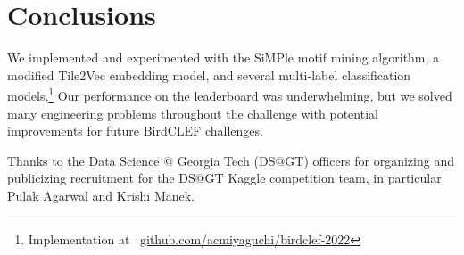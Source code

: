 \documentclass[
]{ceurart}
\begin{document}
\section{Conclusions}

We implemented and experimented with the SiMPle motif mining algorithm, a modified Tile2Vec embedding model, and several multi-label classification models.\footnote{Implementation at \
\href{https://github.com/acmiyaguchi/birdclef-2022}{github.com/acmiyaguchi/birdclef-2022}}
Our performance on the leaderboard was underwhelming, but we solved many engineering problems throughout the challenge with potential improvements for future BirdCLEF challenges.

\begin{acknowledgments}
Thanks to the Data Science @ Georgia Tech (DS@GT) officers for organizing and publicizing recruitment for the DS@GT Kaggle competition team, in particular Pulak Agarwal and Krishi Manek.
\end{acknowledgments}


\appendix
\end{document}
